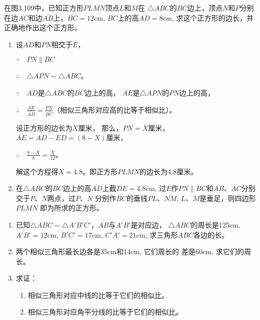 \begin{example}
    在图3.109中，已知正方形$PLMN$顶点$L$和$M$在
    $\triangle ABC$的$\overline{BC}$边上，顶点$N$和$P$分别在边$\overline{AC}$和边$\overline{AB}$上，$\overline{BC}=12$cm, $\overline{BC}$上的高$\overline{AD}=8$cm, 
    求这个正方形的边长，并正确地作出这个正方形。
\end{example}

\begin{solution}
\begin{enumerate}
    \item 设$\overline{AD}$和$\overline{PN}$相交于$E$，

$\because\quad PN\parallel BC$

$\therefore\quad \triangle APN\sim \triangle ABC$。

$\because\quad \overline{AD}$是$\triangle ABC$的$\overline{BC}$边上的高，
$\overline{AE}$是$\triangle APN$的$\overline{PN}$边上的高，

$\therefore\quad \frac{\overline{AE}}{\overline{AD}}=\frac{\overline{PN}}{\overline{BC}}$（相似三角形对应高的比等于相似比）。

设正方形的边长为$X$厘米，
那么，$\overline{PN}=X$厘米，$\overline{AE}=\overline{AD}-\overline{ED}=(8-X)$厘米，

$\therefore\quad \frac{8-X}{8}=\frac{X}{12}$。

解这个方程得$X=4.8$。即正方形$PLMN$的边长为4.8厘米。
\item 在$\triangle ABC$的$\overline{BC}$边上的高$\overline{AD}$上截$\overline{DE}=4.8$cm, 
过$E$作$PN\parallel BC$和$\overline{AB}$、$\overline{AC}$分别交于$P$、$N$两点，过$P$、$N$
分别作$\overline{BC}$的垂线$\overline{PL}$、$\overline{NM}$; $L$、$M$是垂足，则四边形$PLMN$
即为所求的正方形。
\end{enumerate}
\end{solution}

\begin{Practice}
\begin{enumerate}
    \item 已知$\triangle ABC\sim \triangle A'B'C'$，$\overline{AB}$与$\overline{A'B'}$是对应边，
    $\triangle ABC$的周长是125cm, $\overline{A'B'}=12$cm, $\overline{B'C'}=17$cm,  
    $\overline{C'A'}=21$cm, 
求三角形$ABC$各边的长。
\item 两个相似三角形最长边各是35cm和14cm, 它们周长的
差是60cm, 求它们的周长。
\item 求证：
\begin{enumerate}
  \item 相似三角形对应中线的比等于它们的相似比。
  \item 相似三角形对应角平分线的比等于它们的相似比。
\end{enumerate}
\end{enumerate}
\end{Practice}
    
